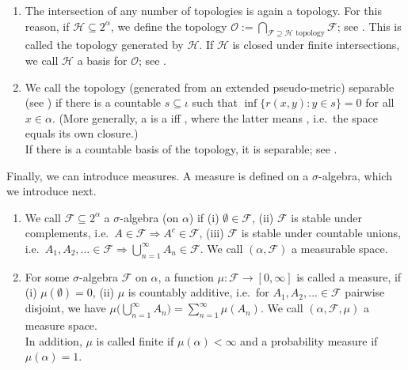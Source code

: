 \documentclass[lean]{DraftAFM}
\begin{document}
\begin{remark}
  \begin{enumerate}
  \item The intersection of any number of topologies is again a
    topology. For this reason, if $\mathcal H \subseteq 2^\alpha$, we
    define the topology $\mathcal O := \bigcap_{\mathcal F \supseteq
      \mathcal H \text{ topology}} \mathcal F$; see
    . This is called the
    topology generated by $\mathcal H$. If $\mathcal H$ is closed
    under finite intersections, we call $\mathcal H$ a basis for
    $\mathcal O$; see .
  \item \sloppy We call the topology (generated from an extended
    pseudo-metric) separable (see
    ) if there is a
    countable $s \subseteq \iota$ such that $\inf\{r(x,y) : y \in s\}
    = 0$ for all $x\in\alpha$. (More generally, a
     is a  iff
    , where the latter means
    , i.e.\ the space equals its
    own closure.) \\ If there is a countable basis of the topology, it
    is separable; see
    .
  \end{enumerate}
\end{remark}

\noindent
Finally, we can introduce measures. A measure is defined on a
$\sigma$-algebra, which we introduce next.

\begin{definition}\label{def:sigma}
  \begin{enumerate}
  \item
    We call $\mathcal F \subseteq 2^\alpha$ a $\sigma$-algebra (on
    $\alpha$) if (i) $\emptyset \in \mathcal F$, (ii) $\mathcal F$ is
    stable under complements, i.e.\ $A \in \mathcal F \Rightarrow A^c
    \in \mathcal F$, (iii) $\mathcal F$ is stable under countable
    unions, i.e.\ $A_1, A_2,... \in \mathcal F \Rightarrow
    \bigcup_{n=1}^\infty A_n \in \mathcal F$. We call $(\alpha,
    \mathcal F)$ a measurable space.
  \item For some $\sigma$-algebra $\mathcal F$ on $\alpha$, a function
    $\mu : \mathcal F \to [0, \infty]$ is called a measure, if (i)
    $\mu(\emptyset) = 0$, (ii) $\mu$ is countably additive, i.e.\ for
    $A_1, A_2,... \in \mathcal F$ pairwise disjoint, we have $\mu\Big(
    \bigcup_{n=1}^\infty A_n\Big) = \sum_{n=1}^\infty \mu(A_n)$. We
    call $(\alpha, \mathcal F, \mu)$ a measure space. \\ In addition,
    $\mu$ is called finite if $\mu(\alpha) < \infty$ and a probability
    measure if $\mu(\alpha)=1$.
  \end{enumerate}
\end{definition}
\end{document}
